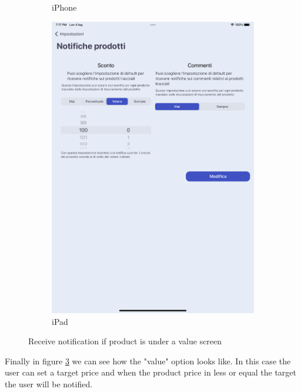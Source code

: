 \begin{figure}[h!]
\begin{subfigure}[b]{0.3\textwidth}
            \caption{iPhone}
            \label{fig:value_notification_screen_iphone}
        \end{subfigure}
        \begin{subfigure}[b]{0.45\textwidth}
            \centering
            \includegraphics[width=\textwidth]{images/interfaces/value_notification_screen_ipad.png}
            \caption{iPad}
            \label{fig:value_notification_screen_ipad}
        \end{subfigure}
         \caption{Receive notification if product is under a value screen}
        \label{fig:value_notification_screen}
\end{figure}
\FloatBarrier
Finally in figure \ref{fig:value_notification_screen} we can see how the "value" option looks like. In this case the user can set a target price and when the product price in less or equal the target the user will be notified.
\\\\

